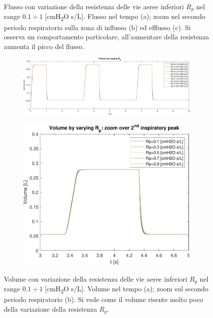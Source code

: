 \begin{figure}[t!]
\begin{subfigure}{0.5\linewidth}
		\caption{}
	\end{subfigure}\hfill
	\caption{Flusso con variazione della resistenza delle vie aeree inferiori $R_p$ nel range $0.1\div 1$ [cmH\textsubscript{2}O s/L]. Flusso nel tempo (a); zoom nel secondo periodo respiratorio sulla zona di influsso (b) ed efflusso (c). Si osserva un comportamento particolare, all'aumentare della resistenza aumenta il picco del flusso.}
	\begin{subfigure}{0.7\linewidth}
		\centering
		\includegraphics[width=0.95\linewidth]{../model/data_log/Rp_volume_total.pdf}
		\caption{}
	\end{subfigure}\hfill
	\begin{subfigure}{0.3\linewidth}
		\centering
		\includegraphics[width=0.95\linewidth]{../model/data_log/Rp_volume_zoom.pdf}
		\caption{}
	\end{subfigure}\hfill
	\caption{Volume con variazione della resistenza delle vie aeree inferiori $R_p$ nel range $0.1\div 1$ [cmH\textsubscript{2}O s/L]. Volume nel tempo (a); zoom sul secondo periodo respiratorio (b). Si vede come il volume risente molto poco della variazione della resistenza $R_p$. }
\end{figure}


